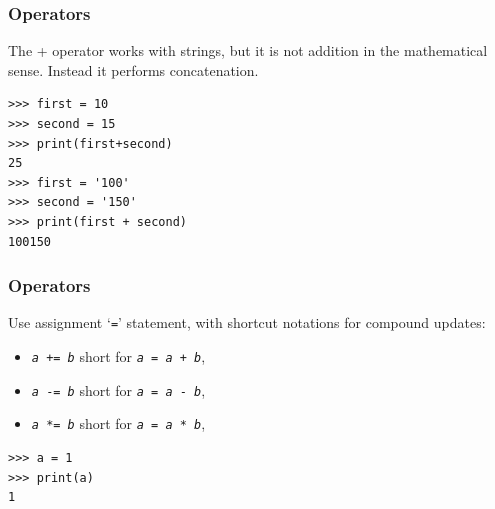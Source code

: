 \begin{frame}[fragile] \frametitle{Operators}
The + operator works with strings, but it is not addition in the mathematical sense. Instead it performs concatenation.
\begin{lstlisting}
>>> first = 10
>>> second = 15
>>> print(first+second)
25
>>> first = '100'
>>> second = '150'
>>> print(first + second)
100150
\end{lstlisting}
\end{frame}

\begin{frame}[fragile] \frametitle{Operators}
Use assignment `\texttt{=}' statement, with shortcut notations for compound updates:
  \begin{itemize}
  \item[] \texttt{\emph{a} += \emph{b}} short for \texttt{\emph{a} = \emph{a} + \emph{b}},
  \item[] \texttt{\emph{a} -= \emph{b}} short for \texttt{\emph{a} = \emph{a} - \emph{b}},
  \item[] \texttt{\emph{a} *= \emph{b}} short for \texttt{\emph{a} = \emph{a} * \emph{b}},
   \end{itemize}
\begin{lstlisting}
>>> a = 1
>>> print(a)
1
\end{lstlisting}
\end{frame}


  
  

  


